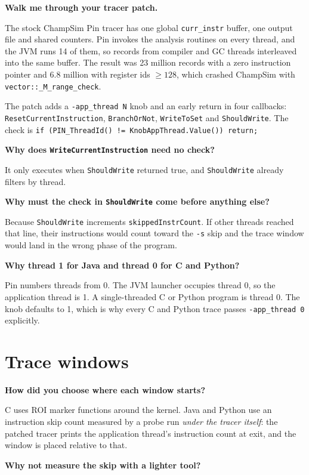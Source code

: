 \documentclass[11pt,a4paper]{article}
\newcommand{\Q}[1]{\begin{question}\textbf{#1}\end{question}}
\begin{document}
\Q{Walk me through your tracer patch.}

The stock ChampSim Pin tracer has one global \texttt{curr\_instr} buffer, one output
file and shared counters. Pin invokes the analysis routines on every thread, and the
JVM runs 14 of them, so records from compiler and GC threads interleaved into the
same buffer. The result was 23 million records with a zero instruction pointer and
6.8 million with register ids $\ge 128$, which crashed ChampSim with
\texttt{vector::\_M\_range\_check}.

The patch adds a \texttt{-app\_thread N} knob and an early return in four callbacks:
\texttt{ResetCurrentInstruction}, \texttt{BranchOrNot}, \texttt{WriteToSet} and
\texttt{ShouldWrite}. The check is
\texttt{if (PIN\_ThreadId() != KnobAppThread.Value()) return;}

\Q{Why does \texttt{WriteCurrentInstruction} need no check?}

It only executes when \texttt{ShouldWrite} returned true, and \texttt{ShouldWrite}
already filters by thread.

\Q{Why must the check in \texttt{ShouldWrite} come before anything else?}

Because \texttt{ShouldWrite} increments \texttt{skippedInstrCount}. If other threads
reached that line, their instructions would count toward the \texttt{-s} skip and the
trace window would land in the wrong phase of the program.

\Q{Why thread 1 for Java and thread 0 for C and Python?}

Pin numbers threads from 0. The JVM launcher occupies thread 0, so the application
thread is 1. A single-threaded C or Python program is thread 0. The knob defaults to
1, which is why every C and Python trace passes \texttt{-app\_thread 0} explicitly.

\section{Trace windows}

\Q{How did you choose where each window starts?}

C uses ROI marker functions around the kernel. Java and Python use an instruction
skip count measured by a probe run \emph{under the tracer itself}: the patched tracer
prints the application thread's instruction count at exit, and the window is placed
relative to that.

\Q{Why not measure the skip with a lighter tool?}
\end{document}
